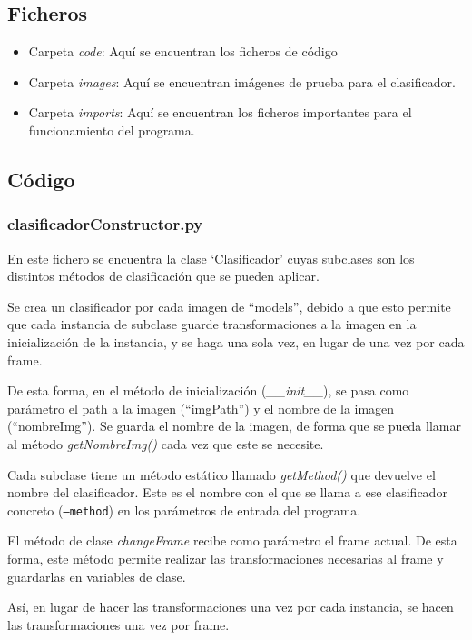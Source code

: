 \documentclass[12pt]{article}
\begin{document}
\subsection*{Ficheros}
\begin{itemize}
    \item Carpeta \textit{code}: Aquí se encuentran los ficheros de código
    \item Carpeta \textit{images}: Aquí se encuentran imágenes de prueba para el clasificador.
    \item Carpeta \textit{imports}: Aquí se encuentran los ficheros importantes para el funcionamiento del programa.
\end{itemize}


\subsection*{Código}
\subsubsection*{clasificadorConstructor.py}
En este fichero se encuentra la clase `Clasificador' cuyas subclases son los distintos métodos de clasificación que se pueden aplicar. 

Se crea un clasificador por cada imagen de ``models'', debido a que esto permite que cada instancia de subclase guarde transformaciones a la imagen en la inicialización de la instancia, y se haga una sola vez, en lugar de una vez por cada frame.

De esta forma, en el método de inicialización (\textit{\_\_init\_\_}), se pasa como parámetro el path a la imagen (``imgPath'') y  el nombre de la imagen (``nombreImg''). Se guarda el nombre de la imagen, de forma que se pueda llamar al método \textit{getNombreImg()} cada vez que este se necesite. 

Cada subclase tiene un método estático llamado \textit{getMethod()} que devuelve el nombre del clasificador. Este es el nombre con el que se llama a ese clasificador concreto (\texttt{--method}) en los parámetros de entrada del programa. 

El método de clase \textit{changeFrame} recibe como parámetro el frame actual. De esta forma, este método permite realizar las transformaciones necesarias al frame y guardarlas en variables de clase.

Así, en lugar de hacer las transformaciones una vez por cada instancia, se hacen las transformaciones una vez por frame.
\end{document}

